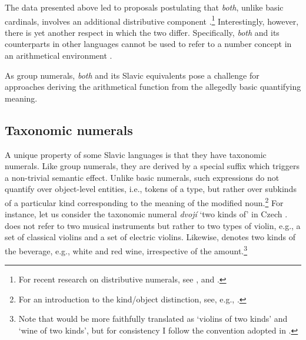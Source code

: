 \documentclass[output=paper]{langscibook}
\begin{document}
	\noindent The data presented above led to proposals postulating that \textit{both}, unlike basic cardinals, involves an additional distributive component \citep[e.g.,][]{ladusaw1982semantic,landman1989groupsi}.\footnote{For recent research on distributive numerals, see \citet{gil2013numeral}, \citet{cable2014distributive} and  \citet{wohlmuth2019atomicity}.} Interestingly, however, there is yet another respect in which the two differ. Specifically, \textit{both} and its counterparts in other languages cannot be used to refer to a number concept in an arithmetical environment .
	
			\ea\label{ex:both-polish} \label{ex:both-polish-arithmetic}
	\label{ex:both-polish-math}
	\z
	\z
	
	\noindent As group numerals, \textit{both} and its Slavic equivalents pose a challenge for approaches deriving the arithmetical function from the allegedly basic quantifying meaning.
	
	\subsection{Taxonomic numerals}\label{sec:taxonomic-numerals}
	
	A unique property of some Slavic languages is that they have taxonomic numerals. Like group numerals, they are derived by a special suffix which triggers a non-trivial semantic effect. Unlike basic numerals, such expressions do not quantify over object-level entities, i.e., tokens of a type, but rather over subkinds of a particular kind corresponding to the meaning of the modified noun.\footnote{For an introduction to the kind/object distinction, see, e.g., \citet{krifka_et_al1995introduction}.} For instance, let us consider the taxonomic numeral \textit{dvojí} `two kinds of' in Czech \citep{docekal2012atoms,docekal2013numerals,grimm_docekal2021counting}.  does not refer to two musical instruments but rather to two types of violin, e.g., a set of classical violins and a set of electric violins. Likewise,  denotes two kinds of the beverage, e.g., white and red wine, irrespective of the amount.\footnote{Note that  would be more faithfully translated as `violins of two kinds' and `wine of two kinds', but for consistency I follow the convention adopted in \citet{docekal2012atoms,docekal2013numerals}.}
	
\end{document}
